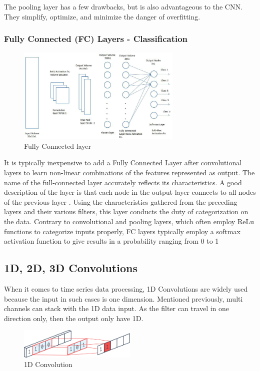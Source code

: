 \documentclass[a4paper, 12pt]{article}
\begin{document}
The pooling layer has a few drawbacks, but is also advantageous to the CNN. They simplify, optimize, and minimize the danger of overfitting.

\subsubsection{Fully Connected (FC) Layers - Classification}

\begin{figure}[H]
    \centering
    \includegraphics[width=0.7\textwidth]{Fully connected.jpeg}
    \caption{Fully Connected layer \citep{}}
    \label{Figure}
\end{figure}

It is typically inexpensive to add a Fully Connected Layer after convolutional layers to learn non-linear combinations of the features represented as output. The name of the full-connected layer accurately reflects its characteristics. A good description of the layer is that each node in the output layer connects to all nodes of the previous layer \citep{8308186}. Using the characteristics gathered from the preceding layers and their various filters, this layer conducts the duty of categorization on the data. Contrary to convolutional and pooling layers, which often employ ReLu functions to categorize inputs properly, FC layers typically employ a softmax activation function to give results in a probability ranging from 0 to 1 \citep{ibmConvNet}

\subsection{1D, 2D, 3D Convolutions}
When it comes to time series data processing, 1D Convolutions are widely used because the input in such cases is one dimension. Mentioned previously, multi channels can stack with the 1D data input.
As the filter can travel in one direction only, then the output only have 1D.

\begin{figure}[H]
    \centering
    \includegraphics[width=0.5\textwidth]{1D Conv.png}
    \caption{1D Convolution}
    \label{Figure}
\end{figure}
\end{document}
